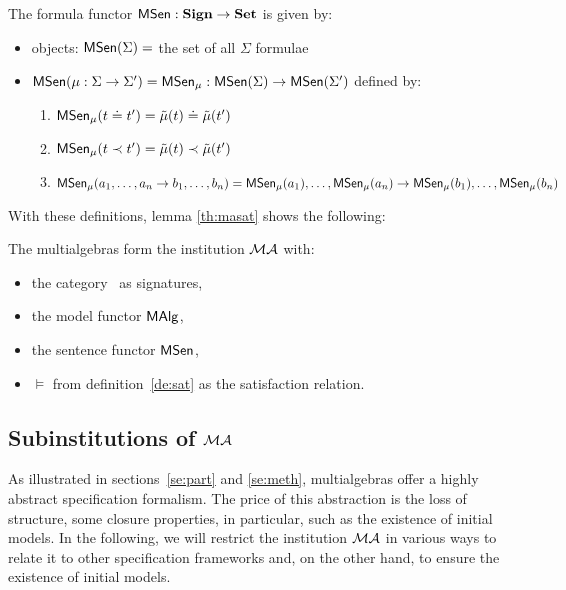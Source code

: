 \documentclass[10pt]{article}
\begin{document}
\begin{definition}
The formula functor ${\sf {MSen}}: {\bf Sign}\to{\bf Set}$ is given by:
\begin{itemize}
\item objects: ${\sf {MSen}}(\Sigma) =$ {the set of all $\Sigma$ formulae}
\item ${\sf {MSen}}(\mu: \Sigma \to \Sigma') = {\sf {MSen}}_{\mu}:{\sf {MSen}}(\Sigma) \to {\sf {MSen}}(\Sigma')$ { defined by}:
		\begin{enumerate}
		\item ${\sf {MSen}}_{\mu}(t \mathrel{\dot{=} }  t') = {\tilde{\mu}}(t) \mathrel{\dot{=} } {\tilde{\mu}}(t')$
		\item ${\sf {MSen}}_{\mu}(t \prec  t') = {\tilde{\mu}}(t) \prec {\tilde{\mu}}(t')$
		\item ${\sf {MSen}}_{\mu}(a_1, \ldots ,a_n \to b_1, \ldots ,b_n) \\ = 
 {\sf {MSen}}_{\mu}(a_1), \ldots ,{\sf {MSen}}_{\mu}(a_n) \to {\sf {MSen}}_{\mu}(b_1), \ldots ,{\sf {MSen}}_{\mu}(b_n)$
		\end{enumerate}
	\end{itemize}
\end{definition}
%
With these definitions, lemma \ref{th:masat} shows the following:
\begin{proposition}\label{fa:mainst}
The multialgebras form the institution ${\mathcal{MA}}$ with:
	\begin{itemize}
	\item the category \Sign\ as signatures,
	\item the model functor ${\sf {MAlg}}$,
	\item the sentence functor ${\sf {MSen}}$,
	\item $\models$ from definition~\ref{de:sat} as the satisfaction relation.
	\end{itemize}
	\end{proposition}

\subsection{Subinstitutions of ${\mathcal{MA}}$}
As illustrated in sections~\ref{se:part} and \ref{se:meth}, multialgebras
offer a highly abstract specification formalism. The price of this
abstraction is the loss of structure, some closure properties, in particular,
such as the existence of initial models.  In the following, we will restrict the institution
${\mathcal{MA}}$ in various ways to relate it to other specification frameworks
and, on the other hand, to ensure the existence of initial models.
\end{document}
